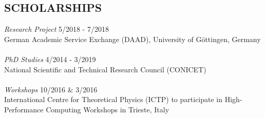 \documentclass[margin]{res}
\begin{document}
\begin{resume}
\section{SCHOLARSHIPS}  {\sl Research Project} \hfill  5/2018 - 7/2018 \\
	German Academic Service Exchange
	(DAAD), University of G\"ottingen, Germany \\ \\ 
	{\sl PhD Studies} \hfill  4/2014 - 3/2019 \\
	National Scientific and Technical Research Council (CONICET) \\ \\
	{\sl Workshops} \hfill { 10/2016 \& 3/2016} \\
	International Centre for Theoretical Physics (ICTP) 
	to participate in High-Performance Computing Workshops in Trieste, Italy



\end{resume}
\end{document}

